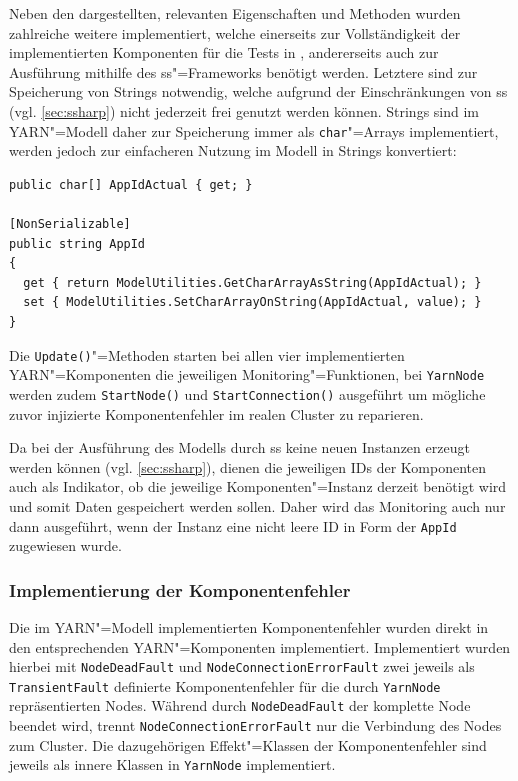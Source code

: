 Neben den dargestellten, relevanten Eigenschaften und Methoden wurden zahlreiche weitere implementiert, welche einerseits zur Vollständigkeit der implementierten Komponenten für die Tests in \cite{Eberhardinger2018}, andererseits auch zur Ausführung mithilfe des \ac{ss}"=Frameworks benötigt werden.
Letztere sind \zB zur Speicherung von Strings notwendig, welche aufgrund der Einschränkungen von \ac{ss} (vgl. \cref{sec:ssharp}) nicht jederzeit frei genutzt werden können.
Strings sind im \ac{YARN}"=Modell daher zur Speicherung immer als  \texttt{char}"=Arrays implementiert, werden jedoch zur einfacheren Nutzung im Modell in Strings konvertiert:

\begin{lstlisting}[label=lst:modelCharArrayAsString,style=cs,
caption={[Implementierung der Eigenschaft AppId]
    Implementierung der Eigenschaft \texttt{AppId}.
    Die beiden Methoden \texttt{GetCharArrayAsString} und \texttt{SetCharArrayOnString} führen die Konvertierung in den \texttt{char}"=Array bzw. des \texttt{char}"=Arrays in einen String durch.}]
public char[] AppIdActual { get; }

[NonSerializable]
public string AppId
{
  get { return ModelUtilities.GetCharArrayAsString(AppIdActual); }
  set { ModelUtilities.SetCharArrayOnString(AppIdActual, value); }
}
\end{lstlisting}

Die \texttt{Update()}"=Methoden starten bei allen vier implementierten \ac{YARN}"=Komponenten die jeweiligen Monitoring"=Funktionen, bei \texttt{YarnNode} werden zudem \texttt{StartNode()} und \texttt{StartConnection()} ausgeführt um mögliche zuvor injizierte Komponentenfehler im realen Cluster zu reparieren.

Da bei der Ausführung des Modells durch \ac{ss} keine neuen Instanzen erzeugt werden können (vgl. \cref{sec:ssharp}), dienen die jeweiligen IDs der Komponenten auch als Indikator, ob die jeweilige Komponenten"=Instanz derzeit benötigt wird und somit Daten gespeichert werden sollen.
Daher wird das Monitoring auch nur dann ausgeführt, wenn der Instanz eine nicht leere ID \zB in Form der \texttt{AppId} zugewiesen wurde.

\subsubsection{Implementierung der Komponentenfehler}
\label{subsubsec:yarnComponentFaults}

Die im \ac{YARN}"=Modell implementierten Komponentenfehler wurden direkt in den entsprechenden \ac{YARN}"=Komponenten implementiert.
Implementiert wurden hierbei mit \texttt{NodeDeadFault} und \texttt{NodeConnectionErrorFault} zwei jeweils als \texttt{TransientFault} definierte Komponentenfehler für die durch \texttt{YarnNode} repräsentierten Nodes.
Während durch \texttt{NodeDeadFault} der komplette Node beendet wird, trennt \texttt{NodeConnectionErrorFault} nur die Verbindung des Nodes zum Cluster.
Die dazugehörigen Effekt"=Klassen der Komponentenfehler sind jeweils als innere Klassen in \texttt{YarnNode} implementiert.

